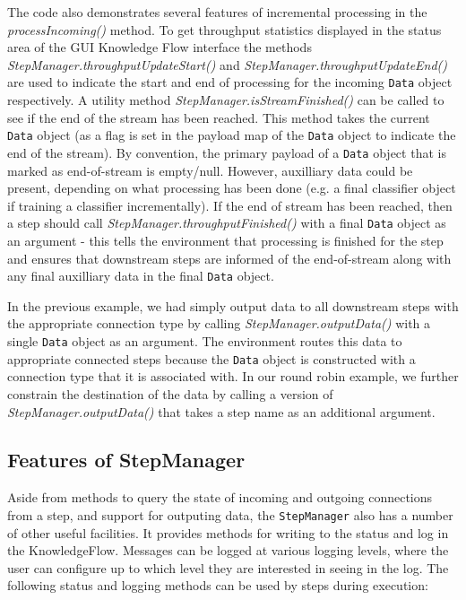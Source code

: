 The code also demonstrates several features of incremental processing
in the \textit{processIncoming()} method. To get throughput statistics
displayed in the status area of the GUI Knowledge Flow interface the
methods \textit{StepManager.throughputUpdateStart()} and
\textit{StepManager.throughputUpdateEnd()} are used to indicate the
start and end of processing for the incoming \verb=Data= object
respectively. A utility method \textit{StepManager.isStreamFinished()}
can be called to see if the end of the stream has been reached. This
method takes the current \verb=Data= object (as a flag is set in the
payload map of the \verb=Data= object to indicate the end of the
stream). By convention, the primary payload of a \verb=Data= object
that is marked as end-of-stream is empty/null. However, auxilliary
data could be present, depending on what processing has been done
(e.g. a final classifier object if training a classifier
incrementally). If the end of stream has been reached, then a step
should call \textit{StepManager.throughputFinished()} with a final
\verb=Data= object as an argument - this tells the environment that
processing is finished for the step and ensures that downstream steps
are informed of the end-of-stream along with any final auxilliary data
in the final \verb=Data= object.

In the previous example, we had simply output data to all downstream
steps with the appropriate connection type by calling
\textit{StepManager.outputData()} with a single \verb=Data= object as
an argument. The environment routes this data to appropriate connected
steps because the \verb=Data= object is constructed with a connection
type that it is associated with. In our round robin example, we
further constrain the destination of the data by calling a version of
\textit{StepManager.outputData()} that takes a step name as an additional
argument.

\subsection{Features of StepManager}

Aside from methods to query the state of incoming and outgoing connections
from a step, and support for outputing data, the \verb=StepManager= also
has a number of other useful facilities. It provides methods for writing
to the status and log in the KnowledgeFlow. Messages can be logged at
various logging levels, where the user can configure up to which level
they are interested in seeing in the log. The following status and logging
methods can be used by steps during execution:

